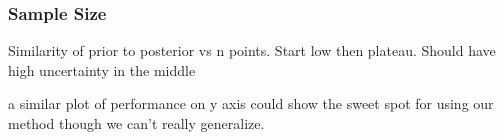 \subsubsection{Sample Size}


Similarity of prior to posterior vs n points. Start low then plateau. Should have high uncertainty in the middle


a similar plot of performance on y axis could show the sweet spot for using our method though we can't really generalize. 
